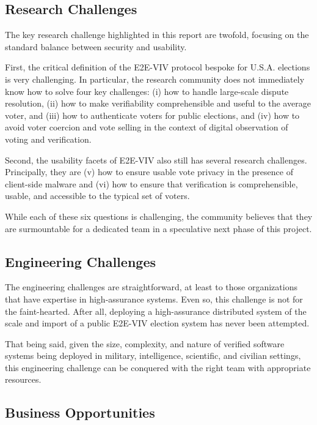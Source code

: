 \subsection{Research Challenges}

The key research challenge highlighted in this report are twofold,
focusing on the standard balance between security and usability.

First, the critical definition of the E2E-VIV protocol bespoke for
U.S.A. elections is very challenging. In particular, the research
community does not immediately know how to solve four key challenges:
(i) how to handle large-scale dispute resolution, (ii) how to make
verifiability comprehensible and useful to the average voter, and
(iii) how to authenticate voters for public elections, and (iv) how to
avoid voter coercion and vote selling in the context of digital
observation of voting and verification.

Second, the usability facets of E2E-VIV also still has several
research challenges. Principally, they are (v) how to ensure usable vote
privacy in the presence of client-side malware and (vi) how to ensure
that verification is comprehensible, usable, and accessible to the
typical set of voters.

While each of these six questions is challenging, the community
believes that they are surmountable for a dedicated team in a
speculative next phase of this project.

\subsection{Engineering Challenges}

The engineering challenges are straightforward, at least to those
organizations that have expertise in high-assurance systems. Even so,
this challenge is not for the faint-hearted. After all, deploying a
high-assurance distributed system of the scale and import of a public
E2E-VIV election system has never been attempted. 

That being said, given the size, complexity, and nature of verified
software systems being deployed in military, intelligence, scientific,
and civilian settings, this engineering challenge can be conquered
with the right team with appropriate resources.

\subsection{Business Opportunities}

